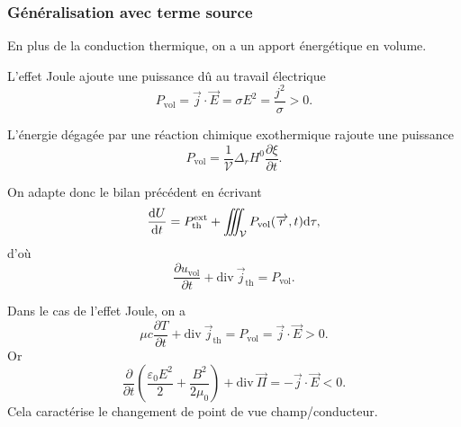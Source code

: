         \subsubsection{Généralisation avec terme source}

            En plus de la conduction thermique, on a un apport énergétique en volume.

            \begin{example}
                L'effet Joule ajoute une puissance dû au travail électrique
                \begin{equation*}
                    P_{\text{vol}}=\vec{j}\cdot\vec{E}=\sigma E^{2}=\frac{j^{2}}{\sigma}>0.
                \end{equation*}
            \end{example}
            \begin{example}
                L'énergie dégagée par une réaction chimique exothermique rajoute une puissance
                \begin{equation*}
                    P_{\text{vol}}=\frac{1}{\mathcal{V}}\Delta_r H^{0}\frac{\partial\xi}{\partial t}.
                \end{equation*}
            \end{example}

            On adapte donc le bilan précédent en écrivant
            \begin{equation*}
                \frac{\mathrm{d} U}{\mathrm{d} t}=P_{\text{th}}^{\text{ext}}+\iiint_{\mathcal{V}}P_{\text{vol}}(\protect\overrightarrow{{r}},t)\mathrm{d}\tau,
            \end{equation*}
            d'où
            \begin{equation*}
                \boxed{
                    \frac{\partial u_{\text{vol}}}{\partial t}+\mathrm{div}~\vec{j}_{\text{th}}=P_{\text{vol}}.
                }
            \end{equation*}

            \begin{example}
                Dans le cas de l'effet Joule, on a 
                \begin{equation*}
                    \mu c\frac{\partial T}{\partial t}+\mathrm{div}~\vec{j}_{\text{th}}=P_{\text{vol}}=\vec{j}\cdot\vec{E}>0.
                \end{equation*}
                Or 
                \begin{equation*}
                    \frac{\partial}{\partial t}\left(\frac{\varepsilon_{0}E^{2}}{2}+\frac{B^{2}}{2\mu_0}\right)+\mathrm{div}~\vec{\Pi}=-\vec{j}\cdot\vec{E}<0.
                \end{equation*}
                Cela caractérise le changement de point de vue champ/conducteur.
            \end{example}

